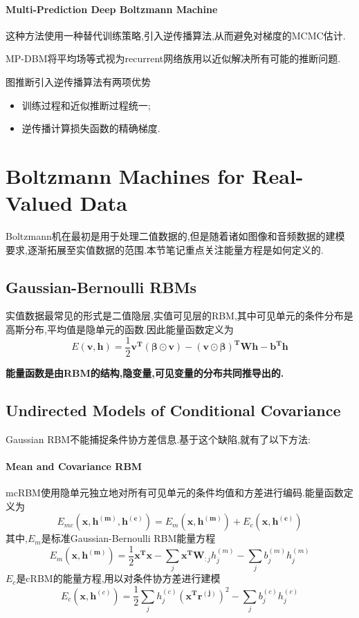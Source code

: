 \paragraph{Multi-Prediction Deep Boltzmann Machine}这种方法使用一种替代训练策略,引入逆传播算法,从而避免对梯度的MCMC估计.

MP-DBM将平均场等式视为recurrent网络族用以近似解决所有可能的推断问题.

图推断引入逆传播算法有两项优势
\begin{itemize}
    \item 训练过程和近似推断过程统一;
    \item 逆传播计算损失函数的精确梯度.
\end{itemize}

\section{Boltzmann Machines for Real-Valued Data}

Boltzmann机在最初是用于处理二值数据的,但是随着诸如图像和音频数据的建模要求,逐渐拓展至实值数据的范围.本节笔记重点关注能量方程是如何定义的.

\subsection{Gaussian-Bernoulli RBMs}

实值数据最常见的形式是二值隐层,实值可见层的RBM,其中可见单元的条件分布是高斯分布,平均值是隐单元的函数.因此能量函数定义为
\begin{equation}
E(\bm{v,h})=\frac{1}{2}\bm{v^T(\beta\odot v)}-\bm{(v\odot\beta)^TWh}-\bm{b^Th}
\end{equation}

\textbf{能量函数是由RBM的结构,隐变量,可见变量的分布共同推导出的.}

\subsection{Undirected Models of Conditional Covariance}

Gaussian RBM不能捕捉条件协方差信息.基于这个缺陷,就有了以下方法:

\paragraph{Mean and Covariance RBM}mcRBM使用隐单元独立地对所有可见单元的条件均值和方差进行编码.能量函数定义为
\begin{equation}
E_{mc}(\bm{x,h^{(m)},h^{(c)}})=E_m(\bm{x,h^{(m)}})+E_c(\bm{x,h^{(c)}})
\end{equation}
其中,$E_m$是标准Gaussian-Bernoulli RBM能量方程
\begin{equation}\label{eq:standard_gb_energy_equation}
E_m(\bm{x,h^{(m)}})=\frac{1}{2}\bm{x^Tx}-\sum_j\bm{x^TW}_{:j}h^{(m)}_j-\sum_jb^{(m)}_jh^{(m)}_j
\end{equation}
$E_c$是cRBM的能量方程,用以对条件协方差进行建模
\begin{equation}
E_c(\bm{x,h}^{(c)})=\frac{1}{2}\sum_jh_j^{(c)}(\bm{x^Tr^{(j)}})^2-\sum_jb_j^{(c)}h_j^{(c)}
\end{equation}

